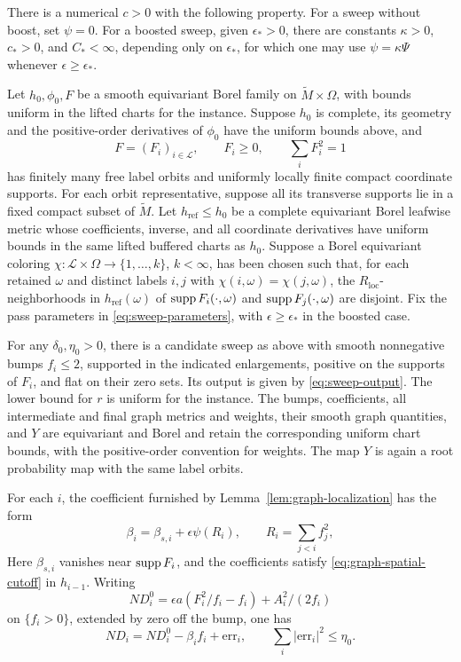 \begin{proposition}
\label{prop:sweep}
There is a numerical \(c>0\) with the following property.
For a sweep without boost, set \(\psi=0\).  For a boosted sweep,
given \(\epsilon_*>0\), there are constants
\(\kappa>0\), \(c_*>0\), and \(C_*<\infty\), depending only on
\(\epsilon_*\), for which one may use \(\psi=\kappa\Psi\) whenever
\(\epsilon\ge\epsilon_*\).

Let \(h_0,\phi_0,F\) be a smooth equivariant Borel family on
\(\widetilde M\times\Omega\), with bounds uniform in the lifted
charts for the instance.  Suppose \(h_0\) is complete, its
geometry and the positive-order derivatives of \(\phi_0\) have
the uniform bounds above, and
\[
 F=(F_i)_{i\in\mathcal L},\qquad F_i\ge0,\qquad
 \sum_iF_i^2=1
\]
has finitely many free label orbits and uniformly locally finite
compact coordinate supports.  For each orbit representative,
suppose all its transverse supports lie in a fixed compact
subset of \(\widetilde M\).  Let \(h_{\mathrm{ref}}\le h_0\)
be a complete equivariant Borel leafwise metric whose coefficients,
inverse, and all coordinate derivatives have uniform bounds in the
same lifted buffered charts as \(h_0\).  Suppose a Borel
equivariant coloring
\(\chi:\mathcal L\times\Omega\to\{1,\ldots,k\}\), \(k<\infty\),
has been chosen such that, for each retained \(\omega\) and distinct
labels \(i,j\) with \(\chi(i,\omega)=\chi(j,\omega)\), the
\(R_{\mathrm{loc}}\)-neighborhoods in \(h_{\mathrm{ref}}(\omega)\)
of \(\operatorname{supp} F_i(\cdot,\omega)\) and \(\operatorname{supp} F_j(\cdot,\omega)\)
are disjoint.  Fix the pass parameters in
\eqref{eq:sweep-parameters}, with \(\epsilon\ge\epsilon_*\) in
the boosted case.

For any \(\delta_0,\eta_0>0\), there is a candidate sweep as above
with smooth nonnegative bumps \(f_i\le2\), supported in the
indicated enlargements, positive on the supports of \(F_i\), and
flat on their zero sets.  Its output is given by
\eqref{eq:sweep-output}.  The lower bound for \(r\) is uniform
for the instance.  The bumps, coefficients, all intermediate and
final graph metrics and weights, their smooth graph quantities, and
\(Y\) are equivariant and Borel and retain the corresponding uniform
chart bounds, with the positive-order convention for weights.
The map \(Y\) is again a
root probability map with the same label orbits.

For each \(i\), the coefficient furnished by
Lemma~\ref{lem:graph-localization} has the form
\begin{equation}
 \beta_i=\beta_{s,i}+\epsilon\psi(R_i),\qquad
 R_i=\sum_{j<i}f_j^2 ,
 \label{eq:sweep-beta}
\end{equation}
Here \(\beta_{s,i}\) vanishes near \(\operatorname{supp} F_i\), and the coefficients
satisfy \eqref{eq:graph-spatial-cutoff} in \(h_{i-1}\).
Writing
\[
 ND_i^0=\epsilon a(F_i^2/f_i-f_i)+A_i^2/(2f_i)
\]
on \(\{f_i>0\}\), extended by zero off the bump, one has
\begin{equation}
 ND_i=ND_i^0-\beta_i f_i+\mathrm{err}_i,\qquad
 \sum_i|\mathrm{err}_i|^2\le\eta_0 .
 \label{eq:sweep-prescription-error}
\end{equation}


\end{proposition}
